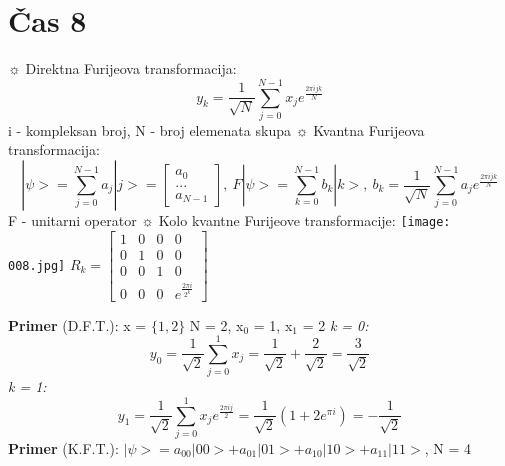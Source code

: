 \documentclass{article}
\begin{document}
\section{Čas 8}
\begin{tcolorbox}[width=\textwidth,colback={beaublue},outer arc=0mm,colupper=charcoal]    
$\sun$ Direktna Furijeova transformacija: 
$$ y_k = \frac{1}{\sqrt{N}}\sum_{j=0}^{N-1} x_j e^{\frac{2\pi ijk}{N}}$$ i - kompleksan broj, N - broj elemenata skupa
\vspace{0.2cm}\newline
$\sun$ Kvantna Furijeova transformacija: 
$$ |\psi> = \sum_{j=0}^{N-1}a_j|j> = \begin{bmatrix}
    a_0\\
    ...\\
    a_{N-1}
\end{bmatrix},\ F|\psi> = \sum_{k=0}^{N-1}b_k|k>,\ b_k = \frac{1}{\sqrt{N}}\sum_{j=0}^{N-1} a_j e^{\frac{2\pi ijk}{N}}$$
F - unitarni operator
\vspace{0.2cm}\newline
$\sun$ Kolo kvantne Furijeove transformacije:\newline
\hspace*{0.2cm}\texttt{[image: 008.jpg]}
\newline $R_k = \begin{bmatrix}
    1 & 0 & 0 & 0\\
    0 & 1 & 0 & 0 \\
    0 & 0 & 1 & 0\\
    0 & 0 & 0 & e^\frac{2\pi i}{2^k}
\end{bmatrix}$
\end{tcolorbox}
\textbf{Primer} (D.F.T.): x = $\{1, 2\}$
\newline\hspace*{0.6cm} N = 2, x$_0$ = 1, x$_1$ = 2
\newline\hspace*{0.6cm} \textit{k = 0:} 
$$ y_0 = \frac{1}{\sqrt{2}}\sum_{j=0}^1 x_j = \frac{1}{\sqrt{2}} + \frac{2}{\sqrt{2}} = \frac{3}{\sqrt{2}}$$
\newline\hspace*{0.6cm} \textit{k = 1:} 
$$ y_1 = \frac{1}{\sqrt{2}}\sum_{j=0}^1 x_j e^\frac{2\pi ij}{2}= \frac{1}{\sqrt{2}}(1 + 2e^{\pi i}) = -\frac{1}{\sqrt{2}}$$
\vspace{0.4cm}\newline
\textbf{Primer} (K.F.T.): $|\psi> = a_{00}|00> + a_{01}|01> + a_{10}|10> + a_{11}|11>$, N = 4
\end{document}
